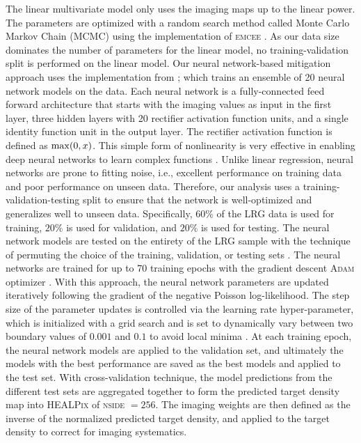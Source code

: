 The linear multivariate model only uses the imaging maps up to the linear power. The parameters are optimized with a random search method called Monte Carlo Markov Chain (MCMC) using the implementation of \textsc{emcee} \citep{2013PASP..125..306F}. As our data size dominates the number of parameters for the linear model, no training-validation split is performed on the linear model. Our neural network-based mitigation approach uses the implementation from \cite{rezaie2021primordial}; which trains an ensemble of 20 neural network models on the data. Each neural network is a fully-connected feed forward architecture that starts with the imaging values as input in the first layer, three hidden layers with 20 rectifier activation function units, and a single identity function unit in the output layer. The rectifier activation function is defined as ${\rm max}(0, x)$. This simple form of nonlinearity is very effective in enabling deep neural networks to learn complex functions \citep{nair2010rectified}. Unlike linear regression, neural networks are prone to fitting noise, i.e., excellent performance on training data and poor performance on unseen data. Therefore, our analysis uses a training-validation-testing split to ensure that the network is well-optimized and generalizes well to unseen data. Specifically, $60\%$ of the LRG data is used for training, $20\%$ is used for validation, and $20\%$ is used for testing. The neural network models are tested on the entirety of the LRG sample with the technique of permuting the choice of the training, validation, or testing sets \citep{arlot2010survey}. The neural networks are trained for up to 70 training epochs with the gradient descent \textsc{Adam} optimizer \citep{2017arXiv171105101L}. With this approach, the neural network parameters are updated iteratively following the gradient of the negative Poisson log-likelihood. The step size of the parameter updates is controlled via the learning rate hyper-parameter, which is initialized with a grid search and is set to dynamically vary between two boundary values of $0.001$ and $0.1$ to avoid local minima \citep{2016arXiv160803983L}. At each training epoch, the neural network models are applied to the validation set, and ultimately the models with the best performance are saved as the best models and applied to the test set. With cross-validation technique, the model predictions from the different test sets are aggregated together to form the predicted target density map into \textsc{HEALPix} of \textsc{nside} $=256$. The imaging weights are then defined as the inverse of the normalized predicted target density, and applied to the target density to correct for imaging systematics.

